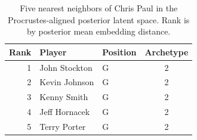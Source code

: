 \begin{table}[htbp]
  \centering\small
  \begin{tabular}{rllc}
    \toprule
    Rank & Player & Position & Archetype \\
    \midrule
    1 & John Stockton & G & 2 \\
    2 & Kevin Johnson & G & 2 \\
    3 & Kenny Smith & G & 2 \\
    4 & Jeff Hornacek & G & 2 \\
    5 & Terry Porter & G & 2 \\
    \bottomrule
  \end{tabular}
  \caption{Five nearest neighbors of Chris Paul in the Procrustes-aligned posterior latent space. Rank is by posterior mean embedding distance.}
  \label{tab:Chris_Paul_neighbors}
\end{table}

